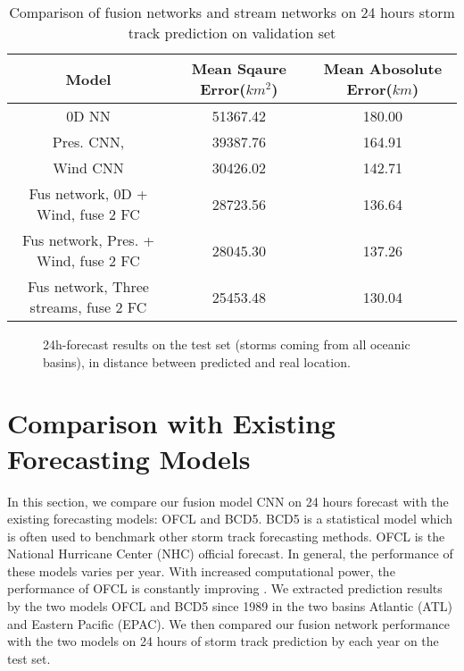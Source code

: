 \begin{table}[]
	\centering
	\caption{Comparison of fusion networks and stream networks on 24 hours storm track prediction on validation set}
	\label{table:fus_compare_}
	\begin{tabular}{|c|c|c|}
		\hline
		Model & Mean Sqaure Error($km^2$) & Mean Abosolute Error($km$) \\ \hline
		0D NN & 51367.42 & 180.00 \\ \hline
		Pres. CNN, & 39387.76 & 164.91 \\ \hline
		Wind CNN & 30426.02 & 142.71 \\ \hline
		Fus network, 0D + Wind, fuse 2 FC  & 28723.56 & 136.64 \\ \hline
		Fus network, Pres. + Wind, fuse 2 FC & 28045.30 & 137.26 \\ \hline
		Fus network, Three streams, fuse 2 FC & 25453.48 & 130.04 \\ \hline
		
		
	\end{tabular}
\end{table}

\begin{figure}
	\begin{center}
		\hsize {}
	\end{center}
	\caption{24h-forecast results on the test set (storms coming from all oceanic basins), in distance between predicted and real location.}
	\label{fig:boxplots}
\end{figure}

\section{Comparison with Existing Forecasting Models}
In this section, we compare our fusion model CNN on 24 hours forecast with the existing forecasting models: OFCL and BCD5. BCD5 is a statistical model which is often used to benchmark other storm track forecasting methods. OFCL is the National Hurricane Center (NHC) official forecast. In general, the performance of these models varies per year. With increased computational power, the performance of OFCL is constantly improving \cite{hurricane_models}. We extracted prediction results by the two models OFCL and BCD5 since 1989 in the two basins Atlantic (ATL) and Eastern Pacific (EPAC). We then compared our fusion network performance with the two models on 24 hours of storm track prediction by each year on the test set.
